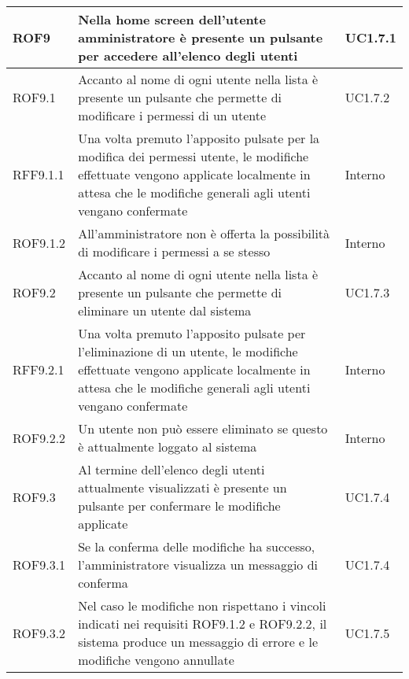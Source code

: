 \begin{center}
\begin{longtable}{| p{2.5cm} | p{8cm} | p{2cm} |}
		ROF9  &  Nella home screen dell'utente amministratore è presente un pulsante per accedere all'elenco degli utenti  &  UC1.7.1 \\
		\hline
		ROF9.1  &  Accanto al nome di ogni utente nella lista è presente un pulsante che permette di modificare i permessi di un utente  &  UC1.7.2 \\
		\hline
		RFF9.1.1  &  Una volta premuto l'apposito pulsate per la modifica dei permessi utente, le modifiche effettuate vengono applicate localmente in attesa che le modifiche generali agli utenti vengano confermate  &  Interno \\
		\hline
		ROF9.1.2  &  All'amministratore non è offerta la possibilità di modificare i permessi a se stesso  &  Interno \\
		\hline
		ROF9.2  &  Accanto al nome di ogni utente nella lista è presente un pulsante che permette di eliminare un utente dal sistema  &  UC1.7.3 \\
		\hline
		RFF9.2.1  &  Una volta premuto l'apposito pulsate per l'eliminazione di un utente, le modifiche effettuate vengono applicate localmente in attesa che le modifiche generali agli utenti vengano confermate  &  Interno \\
		\hline
		ROF9.2.2  &  Un utente non può essere eliminato se questo è attualmente loggato al sistema  &  Interno \\
		\hline
		ROF9.3  &  Al termine dell'elenco degli utenti attualmente visualizzati è presente un pulsante per confermare le modifiche applicate  &  UC1.7.4 \\
		\hline
		ROF9.3.1  &  Se la conferma delle modifiche ha successo, l'amministratore visualizza un messaggio di conferma  &  UC1.7.4 \\
		\hline
		ROF9.3.2  &  Nel caso le modifiche non rispettano i vincoli indicati nei requisiti ROF9.1.2 e ROF9.2.2, il sistema produce un messaggio di errore e le modifiche vengono annullate  &  UC1.7.5 \\
		\hline



\end{longtable}
\end{center}
